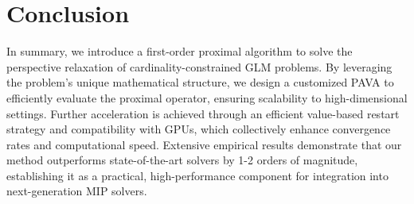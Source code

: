 \vspace{-3.5mm}
\section{Conclusion}
\vspace{-2mm}

In summary, we introduce a first-order proximal algorithm to solve the perspective relaxation of cardinality-constrained GLM problems.
By leveraging the problem’s unique mathematical structure, we design a customized PAVA to efficiently evaluate the proximal operator, ensuring scalability to high-dimensional settings.
Further acceleration is achieved through an efficient value-based restart strategy and compatibility with GPUs, which collectively enhance convergence rates and computational speed.
Extensive empirical results demonstrate that our method outperforms state-of-the-art solvers by 1-2 orders of magnitude, establishing it as a practical, high-performance component for integration into next-generation MIP solvers.
